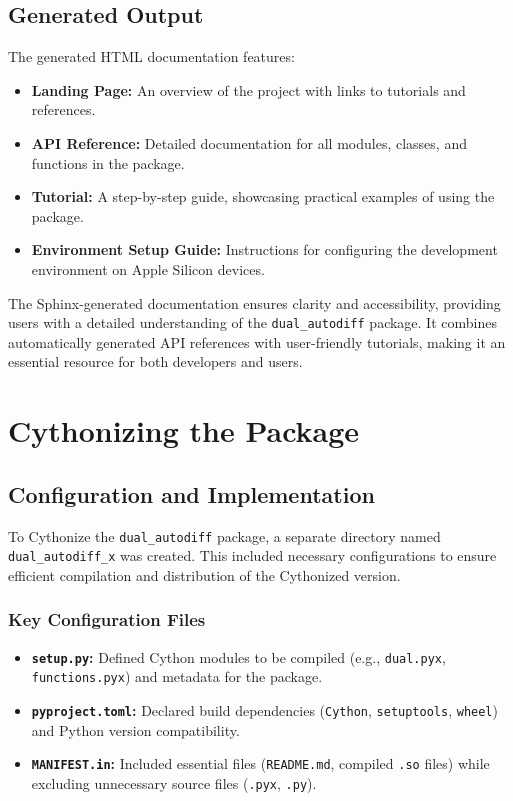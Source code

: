 \documentclass[a4paper,12pt]{article}
\begin{document}
\subsection{Generated Output}
The generated HTML documentation features:
\begin{itemize}
    \item \textbf{Landing Page:} An overview of the project with links to tutorials and references.
    \item \textbf{API Reference:} Detailed documentation for all modules, classes, and functions in the package.
    \item \textbf{Tutorial:} A step-by-step guide, showcasing practical examples of using the package.
    \item \textbf{Environment Setup Guide:} Instructions for configuring the development environment on Apple Silicon devices.
\end{itemize}

The Sphinx-generated documentation ensures clarity and accessibility, providing users with a detailed understanding of the \texttt{dual\_autodiff} package. It combines automatically generated API references with user-friendly tutorials, making it an essential resource for both developers and users.

\section{Cythonizing the Package}

\subsection{Configuration and Implementation}
To Cythonize the \texttt{dual\_autodiff} package, a separate directory named \texttt{dual\_autodiff\_x} was created. This included necessary configurations to ensure efficient compilation and distribution of the Cythonized version.

\subsubsection{Key Configuration Files}
\begin{itemize}
    \item \textbf{\texttt{setup.py}:} Defined Cython modules to be compiled (e.g., \texttt{dual.pyx}, \texttt{functions.pyx}) and metadata for the package.
    \item \textbf{\texttt{pyproject.toml}:} Declared build dependencies (\texttt{Cython}, \texttt{setuptools}, \texttt{wheel}) and Python version compatibility.
    \item \textbf{\texttt{MANIFEST.in}:} Included essential files (\texttt{README.md}, compiled \texttt{.so} files) while excluding unnecessary source files (\texttt{.pyx}, \texttt{.py}).
\end{itemize}
\end{document}
